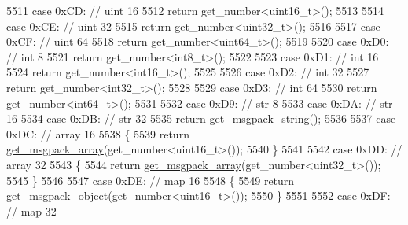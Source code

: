 \begin{DoxyCode}
5511             \textcolor{keywordflow}{case} 0xCD: \textcolor{comment}{// uint 16}
5512                 \textcolor{keywordflow}{return} get\_number<uint16\_t>();
5513 
5514             \textcolor{keywordflow}{case} 0xCE: \textcolor{comment}{// uint 32}
5515                 \textcolor{keywordflow}{return} get\_number<uint32\_t>();
5516 
5517             \textcolor{keywordflow}{case} 0xCF: \textcolor{comment}{// uint 64}
5518                 \textcolor{keywordflow}{return} get\_number<uint64\_t>();
5519 
5520             \textcolor{keywordflow}{case} 0xD0: \textcolor{comment}{// int 8}
5521                 \textcolor{keywordflow}{return} get\_number<int8\_t>();
5522 
5523             \textcolor{keywordflow}{case} 0xD1: \textcolor{comment}{// int 16}
5524                 \textcolor{keywordflow}{return} get\_number<int16\_t>();
5525 
5526             \textcolor{keywordflow}{case} 0xD2: \textcolor{comment}{// int 32}
5527                 \textcolor{keywordflow}{return} get\_number<int32\_t>();
5528 
5529             \textcolor{keywordflow}{case} 0xD3: \textcolor{comment}{// int 64}
5530                 \textcolor{keywordflow}{return} get\_number<int64\_t>();
5531 
5532             \textcolor{keywordflow}{case} 0xD9: \textcolor{comment}{// str 8}
5533             \textcolor{keywordflow}{case} 0xDA: \textcolor{comment}{// str 16}
5534             \textcolor{keywordflow}{case} 0xDB: \textcolor{comment}{// str 32}
5535                 \textcolor{keywordflow}{return} \hyperlink{classnlohmann_1_1detail_1_1binary__reader_aca08d17b5a8230eb6738628934b3b5a5}{get\_msgpack\_string}();
5536 
5537             \textcolor{keywordflow}{case} 0xDC: \textcolor{comment}{// array 16}
5538             \{
5539                 \textcolor{keywordflow}{return} \hyperlink{classnlohmann_1_1detail_1_1binary__reader_a7adeb751743afe4233d75d351252bc93}{get\_msgpack\_array}(get\_number<uint16\_t>());
5540             \}
5541 
5542             \textcolor{keywordflow}{case} 0xDD: \textcolor{comment}{// array 32}
5543             \{
5544                 \textcolor{keywordflow}{return} \hyperlink{classnlohmann_1_1detail_1_1binary__reader_a7adeb751743afe4233d75d351252bc93}{get\_msgpack\_array}(get\_number<uint32\_t>());
5545             \}
5546 
5547             \textcolor{keywordflow}{case} 0xDE: \textcolor{comment}{// map 16}
5548             \{
5549                 \textcolor{keywordflow}{return} \hyperlink{classnlohmann_1_1detail_1_1binary__reader_a8fd9972d8bbb03b49acbaaf641151859}{get\_msgpack\_object}(get\_number<uint16\_t>());
5550             \}
5551 
5552             \textcolor{keywordflow}{case} 0xDF: \textcolor{comment}{// map 32}

\end{DoxyCode}

